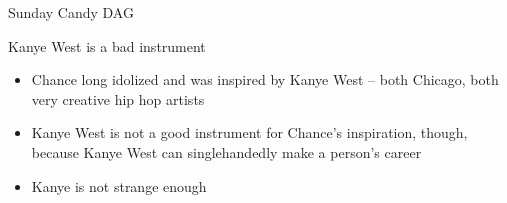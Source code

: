 \documentclass{beamer}
\begin{document}
\begin{frame}{Sunday Candy DAG}


  \begin{center}
    \begin{minipage}{.5\textwidth}

      \begin{center}

      \end{center}
    \end{minipage}


  \end{center}


\end{frame}


\begin{frame}{Kanye West is a bad instrument}

  \begin{itemize}
    \item Chance long idolized and was inspired by Kanye West -- both Chicago, both very creative hip hop artists
    \item Kanye West is not a good instrument for Chance's inspiration, though, because Kanye West can singlehandedly make a person's career
    \item Kanye is not strange enough
  \end{itemize}

\end{frame}
\end{document}
